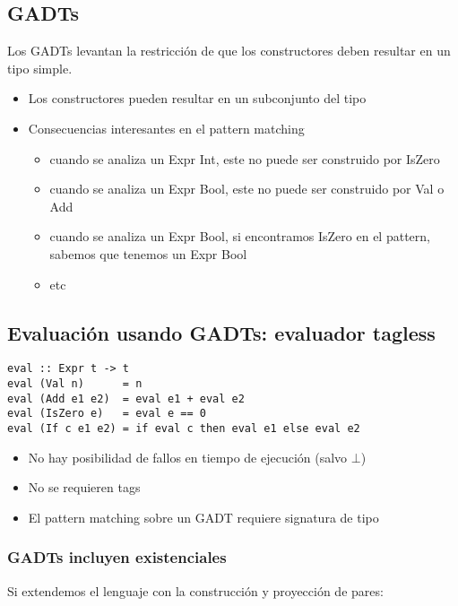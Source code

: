\documentclass{article}
\newcommand{\imp}[1]{\textcolor{color1}{#1}}
\begin{document}
\subsection{GADTs}

Los GADTs levantan la restricción de que los constructores deben resultar en un tipo simple.

\begin{itemize}
\item Los constructores pueden resultar en un subconjunto del tipo
\item Consecuencias interesantes en el pattern matching
\begin{itemize}
\item cuando se analiza un \imp{Expr Int}, este no puede ser construido por \imp{IsZero}
\item cuando se analiza un \imp{Expr Bool}, este no puede ser construido
por \imp{Val} o \imp{Add}
\item cuando se analiza un \imp{Expr Bool}, si encontramos \imp{IsZero} en el
pattern, sabemos que tenemos un \imp{Expr Bool}
\item etc
\end{itemize}
\end{itemize}

\subsection{Evaluación usando GADTs: evaluador tagless}

\begin{lstlisting}
eval :: Expr t -> t
eval (Val n)      = n
eval (Add e1 e2)  = eval e1 + eval e2
eval (IsZero e)   = eval e == 0
eval (If c e1 e2) = if eval c then eval e1 else eval e2
\end{lstlisting}

\begin{itemize}
\item No hay posibilidad de fallos en tiempo de ejecución (salvo $\bot$)
\item No se requieren tags
\item El pattern matching sobre un GADT requiere signatura de tipo
\end{itemize}

\subsubsection{GADTs incluyen existenciales}

Si extendemos el lenguaje con la construcción y proyección de
pares:
\end{document}
